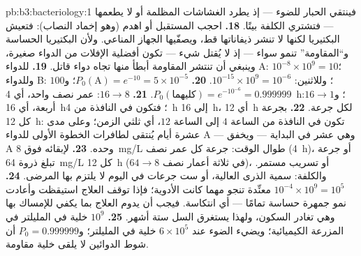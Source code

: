 \begin{solution}{pb:b3:bacteriology:1}
فينتقي الحبار للضوء --- إذ يطرد الغشاشات المظلمة أو لا يطعمها
--- فتشتري الكلفة بيتًا.
\textbf{18.} احجب المستقبل أو اهدم  (وهو إخماد
النصاب): فتعيش البكتيريا لكنها لا تنشر ذيفاناتها قط، ويصفّيها
الجهاز المناعي. ولأن البكتيريا الحساسة و``المقاومة'' تنمو
سواء --- إذ لا يُقتل شيء --- تكون أفضلية
الإفلات من الدواء صغيرة، وينبغي أن تنتشر المقاومة أبطأ
منها تجاه دواء قاتل.
\textbf{19.} للدواء A: $10^{-8}\times 10^{9} = 10$؛ وللدواء B: $100$؛ وللاثنين: $10^{-15}\times
10^{9} = 10^{-6}$.
\textbf{20.} $P_{0}(\text{A}) = e^{-10} = 5\times 10^{-5}$؛
و$P_{0}(\text{كليهما}) = e^{-10^{-6}} = 0.999999$.
\textbf{21.} $16 \to 8$: عمر نصف واحد، أي \qty{4}{h}؛ و$16 \to 1$: أربعة،
أي \qty{16}{h}؛ فتكون في النافذة من \qty{4}{h} إلى \qty{16}{h}، أي \qty{12}{h}
لكل جرعة.
\textbf{22.} بجرعة كل \qty{12}{h}: تكون في النافذة من الساعة $4$ إلى
الساعة $12$، أي ثلثي الزمن؛ وعلى مدى عشرة أيام يُنتقى لطافرات
الخطوة الأولى للدواء A --- وهي عشر في البداية --- ويخفق A وحده.
\textbf{23.} لإبقائه فوق \qty{8}{mg/L} طوال الوقت: جرعة كل عمر نصف
(\qty{4}{h})، أو جرعة تبلغ ذروة \qty{64}{mg/L} كل \qty{12}{h}
($64 \to 8$ في ثلاثة أعمار نصف)، أو تسريب مستمر. والكلفة:
سمية الذرى العالية، أو ست جرعات في اليوم لا يلتزم بها
المرضى.
\textbf{24.} $10^{-4}\times 10^{9} = 10^{5}$ معنِّدة تنجو مهما كانت
الأدوية؛ فإذا توقف العلاج استيقظت وأعادت نمو جمهرة حساسة
تمامًا --- أي انتكاسة. فيجب أن يدوم العلاج بما يكفي للإمساك
بها وهي تغادر السكون، ولهذا يستغرق السل ستة أشهر.
\textbf{25.} $10^{9}$ خلية في المليلتر في المزرعة الكيميائية؛ ويضيء الضوء عند
$6\times 10^{5}$ خلية في المليلتر؛ و$P_{0} = 0.999999$ أن شوط الدوائين
لا يلقى خلية مقاومة.
\end{solution}
